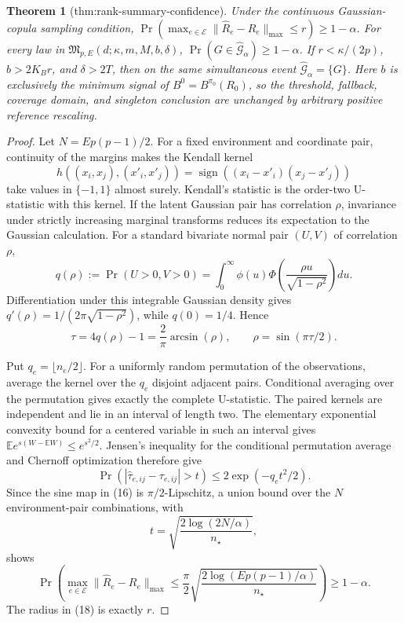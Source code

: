 \documentclass{article}
\newtheorem{theorem}{Theorem}
\begin{document}
\begin{theorem}[thm:rank-summary-confidence]\label{thm:rank-summary-confidence}
Under the continuous Gaussian-copula sampling condition, \(\Pr(\max_{e\in\mathcal E}\lVert\widehat R_e-R_e\rVert_{\max}\le r)\ge1-\alpha\). For every law in \(\mathfrak M_{p,E}(d;\kappa,m,M,b,\delta)\), \(\Pr(G\in\widehat{\mathcal G}_{\alpha})\ge1-\alpha\). If \(r<\kappa/(2p)\), \(b>2K_Br\), and \(\delta>2T\), then on the same simultaneous event \(\widehat{\mathcal G}_{\alpha}=\{G\}\). Here \(b\) is exclusively the minimum signal of \(B^0=B^{\pi_0}(R_0)\), so the threshold, fallback, coverage domain, and singleton conclusion are unchanged by arbitrary positive reference rescaling.
\end{theorem}
\begin{proof}
Let \(N=Ep(p-1)/2\).  For a fixed environment and coordinate pair, continuity of the margins makes the Kendall kernel
\[
 h((x_i,x_j),(x'_i,x'_j))
 =\operatorname{sign}((x_i-x'_i)(x_j-x'_j))
\]
take values in \(\{-1,1\}\) almost surely.  Kendall's statistic is the order-two U-statistic with this kernel.  If the latent Gaussian pair has correlation \(\rho\), invariance under strictly increasing marginal transforms reduces its expectation to the Gaussian calculation.  For a standard bivariate normal pair \((U,V)\) of correlation \(\rho\),
\[
 q(\rho):=\Pr(U>0,V>0)
 =\int_0^\infty\phi(u)\Phi\!\left(\frac{\rho u}{\sqrt{1-\rho^2}}\right)du.
\]
Differentiation under this integrable Gaussian density gives
\(q'(\rho)=1/(2\pi\sqrt{1-\rho^2})\), while \(q(0)=1/4\).  Hence
\[
 \tau=4q(\rho)-1=\frac{2}{\pi}\arcsin(\rho),
 \qquad \rho=\sin(\pi\tau/2). \tag{16}
\]

Put \(q_e=\lfloor n_e/2\rfloor\).  For a uniformly random permutation of the observations, average the kernel over the \(q_e\) disjoint adjacent pairs.  Conditional averaging over the permutation gives exactly the complete U-statistic.  The paired kernels are independent and lie in an interval of length two.  The elementary exponential convexity bound for a centered variable in such an interval gives
\(\mathbb E e^{s(W-\mathbb EW)}\le e^{s^2/2}\).  Jensen's inequality for the conditional permutation average and Chernoff optimization therefore give
\[
 \Pr(|\widehat\tau_{e,ij}-\tau_{e,ij}|>t)
 \le2\exp(-q_et^2/2). \tag{17}
\]
Since the sine map in (16) is \(\pi/2\)-Lipschitz, a union bound over the \(N\) environment-pair combinations, with
\[
 t=\sqrt{\frac{2\log(2N/\alpha)}{n_\star}},
\]
shows
\[
 \Pr\!\left(\max_{e\in\mathcal E}
 \|\widehat R_e-R_e\|_{\max}\le
 \frac{\pi}{2}\sqrt{\frac{2\log(Ep(p-1)/\alpha)}{n_\star}}
 \right)\ge1-\alpha. \tag{18}
\]
The radius in (18) is exactly \(r\).


\end{proof}
\end{document}
